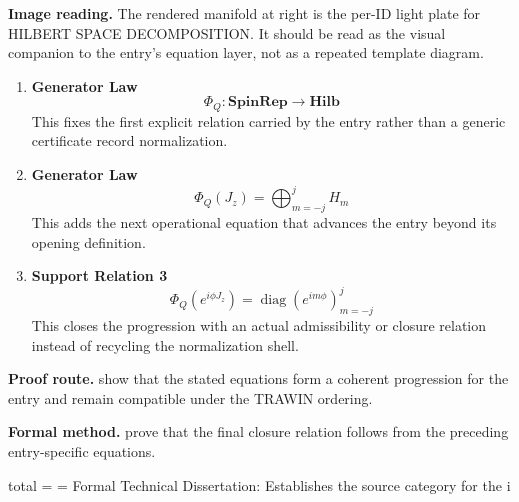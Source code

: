 \begin{samepage}
\noindent\begin{minipage}[t]{0.45\linewidth}
\vspace{0pt}
\raggedright
\scriptsize\textbf{Image reading.} The rendered manifold at right is the per-ID light plate for HILBERT SPACE DECOMPOSITION. It should be read as the visual companion to the entry's equation layer, not as a repeated template diagram.\par
\end{minipage}\hfill
\begin{minipage}[t]{0.53\linewidth}
\vspace*{-0.10in}
\raggedright
{}
\end{minipage}
\end{samepage}

\clearpage


\begin{enumerate}[leftmargin=1.6em,itemsep=9pt,topsep=6pt]
\item \textbf{Generator Law}
\[
\Phi_Q:\mathbf{SpinRep}\to\mathbf{Hilb}
\]
This fixes the first explicit relation carried by the entry rather than a generic certificate record normalization.

\item \textbf{Generator Law}
\[
\Phi_Q(J_z)=\bigoplus_{m=-j}^{j}H_m
\]
This adds the next operational equation that advances the entry beyond its opening definition.

\item \textbf{Support Relation 3}
\[
\Phi_Q(e^{i\phi J_z})=\operatorname{diag}(e^{im\phi})_{m=-j}^{j}
\]
This closes the progression with an actual admissibility or closure relation instead of recycling the normalization shell.
\end{enumerate}

\textbf{Proof route.} show that the stated equations form a coherent progression for the entry and remain compatible under the TRAWIN ordering.

\textbf{Formal method.} prove that the final closure relation follows from the preceding entry-specific equations.

\medskip
{}

\begin{tzpsnapshot}
\end{tzpsnapshot}

\tzpequationlinks
  { {total} = \cdots}
  { = \cdots}
  {Formal Technical Dissertation: Establishes the source category for the i}

